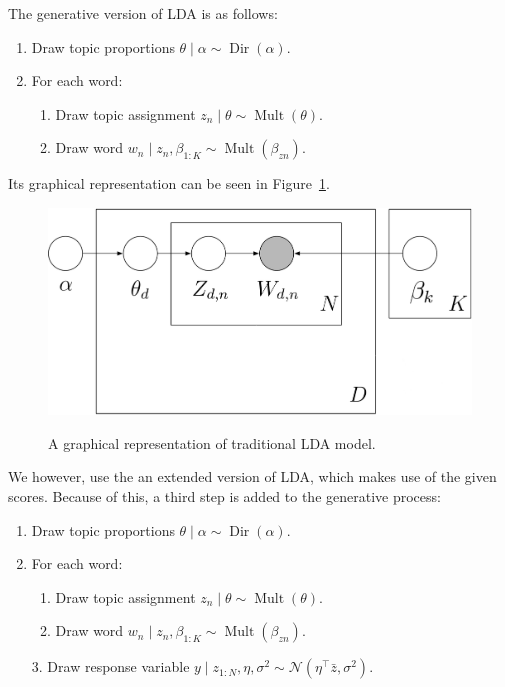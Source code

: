 \documentclass[a4paper,10pt]{article}
\DeclareMathOperator{\Dir}{Dir}
\DeclareMathOperator{\Mult}{Mult}
\begin{document}
The generative version of LDA is as follows:
\begin{enumerate}
  \item Draw topic proportions $\theta \mid \alpha \sim \Dir(\alpha)$.
  \item For each word:
  \begin{enumerate}
    \item Draw topic assignment $z_n \mid \theta \sim \Mult(\theta)$.
    \item Draw word $w_n \mid z_n, \beta_{1:K} \sim \Mult(\beta_{zn})$.
  \end{enumerate}
\end{enumerate}
Its graphical representation can be seen in Figure~\ref{fig:LDA}.

\begin{figure}[ht!]
  \centering
  \includegraphics[width=\textwidth]{LDA.png}
  \label{fig:LDA}
  \caption{A graphical representation of traditional LDA model.}
\end{figure}

We however, use the an extended version of LDA, which makes use of the given scores. 
Because of this, a third step is added to the generative process:

\begin{enumerate}
  \item Draw topic proportions $\theta \mid \alpha \sim \Dir(\alpha)$.
  \item For each word:
  \begin{enumerate}
    \item Draw topic assignment $z_n \mid \theta \sim \Mult(\theta)$.
    \item Draw word $w_n \mid z_n, \beta_{1:K} \sim \Mult(\beta_{zn})$.
  \end{enumerate}
  \item[3.] Draw response variable $y \mid z_{1:N}, \eta, \sigma^2 \sim \mathcal{N}(\eta^\top \bar{z}, \sigma^2)$.
\end{enumerate}
\end{document}
